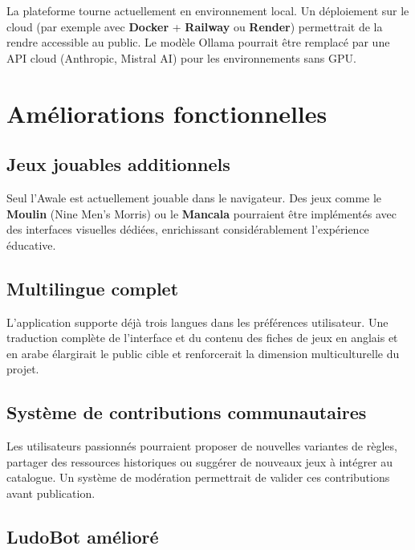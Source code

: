 La plateforme tourne actuellement en environnement local. Un déploiement sur le cloud
(par exemple avec \textbf{Docker} + \textbf{Railway} ou \textbf{Render}) permettrait de la
rendre accessible au public. Le modèle Ollama pourrait être remplacé par une API cloud
(Anthropic, Mistral AI) pour les environnements sans GPU.

\section{Améliorations fonctionnelles}

\subsection{Jeux jouables additionnels}

Seul l'Awale est actuellement jouable dans le navigateur. Des jeux comme le \textbf{Moulin}
(Nine Men's Morris) ou le \textbf{Mancala} pourraient être implémentés avec des interfaces
visuelles dédiées, enrichissant considérablement l'expérience éducative.

\subsection{Multilingue complet}

L'application supporte déjà trois langues dans les préférences utilisateur. Une traduction
complète de l'interface et du contenu des fiches de jeux en anglais et en arabe élargirait
le public cible et renforcerait la dimension multiculturelle du projet.

\subsection{Système de contributions communautaires}

Les utilisateurs passionnés pourraient proposer de nouvelles variantes de règles, partager
des ressources historiques ou suggérer de nouveaux jeux à intégrer au catalogue. Un système
de modération permettrait de valider ces contributions avant publication.

\subsection{LudoBot amélioré}

